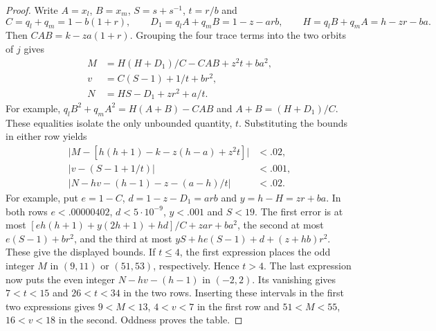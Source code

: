 \documentclass[11pt,reqno]{amsart}
\theoremstyle{remark}\newtheorem{remark}[theorem]{Remark}
\numberwithin{equation}{section}
\begin{document}
\begin{proof}
Write $A=x_l$, $B=x_m$, $S=s+s^{-1}$, $t=r/b$ and
\[
 C=q_l+q_m=1-b(1+r),\qquad
 D_1=q_l A+q_m B=1-z-arb,\qquad H=q_lB+q_m A=h-zr-ba .
\]
Then $CAB=k-za(1+r)$. Grouping the four trace terms into the two
orbits of $j$ gives
\begin{align*}
 M&=H(H+D_1)/C-CAB+z^2t+ba^2,\\
 v&=C(S-1)+1/t+br^2,\\
 N&=HS-D_1+zr^2+a/t .
\end{align*}
For example, $q_lB^2+q_mA^2=H(A+B)-CAB$ and
$A+B=(H+D_1)/C$. These equalities isolate the only unbounded
quantity, $t$. Substituting the bounds in either row yields
\begin{align*}
 \big|M-[h(h+1)-k-z(h-a)+z^2t]\big|&<.02,\\
 \big|v-(S-1+1/t)\big|&<.001,\\
 \big|N-hv-(h-1)-z-(a-h)/t\big|&<.02 .
\end{align*}
For example, put $e=1-C$, $d=1-z-D_1=arb$ and $y=h-H=zr+ba$.
In both rows $e<.00000402$, $d<5\cdot10^{-9}$, $y<.001$ and $S<19$.
The first error is at most
$[eh(h+1)+y(2h+1)+hd]/C+zar+ba^2$, the second at most
$e(S-1)+br^2$, and the third at most
$yS+he(S-1)+d+(z+hb)r^2$. These give the displayed bounds.
If $t\le4$, the first expression places the odd integer $M$
in $(9,11)$ or $(51,53)$, respectively. Hence $t>4$. The last
expression now puts the even integer $N-hv-(h-1)$ in $(-2,2)$.
Its vanishing gives $7<t<15$ and $26<t<34$ in the two rows.
Inserting these intervals in the first two expressions gives
$9<M<13$, $4<v<7$ in the first row and
$51<M<55$, $16<v<18$ in the second. Oddness proves the table.
\end{proof}
\end{document}
